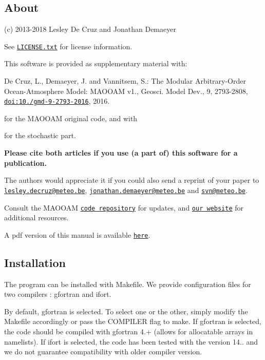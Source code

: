 \subsection*{About}

(c) 2013-\/2018 Lesley De Cruz and Jonathan Demaeyer

See \href{../../LICENSE.txt}{\tt L\+I\+C\+E\+N\+S\+E.\+txt} for license information.

This software is provided as supplementary material with\+:


\begin{DoxyItemize}
\item De Cruz, L., Demaeyer, J. and Vannitsem, S.\+: The Modular Arbitrary-\/\+Order Ocean-\/\+Atmosphere Model\+: M\+A\+O\+O\+AM v1., Geosci. Model Dev., 9, 2793-\/2808, \href{http://dx.doi.org/10.5194/gmd-9-2793-2016}{\tt doi\+:10./gmd-\/9-\/2793-\/2016}, 2016.
\end{DoxyItemize}

for the M\+A\+O\+O\+AM original code, and with


\begin{DoxyItemize}
\item for the stochastic part.
\end{DoxyItemize}

{\bfseries Please cite both articles if you use (a part of) this software for a publication.}

The authors would appreciate it if you could also send a reprint of your paper to \href{mailto:lesley.decruz@meteo.be}{\tt lesley.\+decruz@meteo.\+be}, \href{mailto:jonathan.demaeyer@meteo.be}{\tt jonathan.\+demaeyer@meteo.\+be} and \href{mailto:svn@meteo.be}{\tt svn@meteo.\+be}.

Consult the M\+A\+O\+O\+AM \href{http://www.github.com/Climdyn/MAOOAM}{\tt code repository} for updates, and \href{http://climdyn.meteo.be}{\tt our website} for additional resources.

A pdf version of this manual is available \href{../latex/Reference_manual.pdf}{\tt here}. 



\subsection*{Installation}

The program can be installed with Makefile. We provide configuration files for two compilers \+: gfortran and ifort.

By default, gfortran is selected. To select one or the other, simply modify the Makefile accordingly or pass the C\+O\+M\+P\+I\+L\+ER flag to {\ttfamily make}. If gfortran is selected, the code should be compiled with gfortran 4.+ (allows for allocatable arrays in namelists). If ifort is selected, the code has been tested with the version 14.. and we do not guarantee compatibility with older compiler version.

